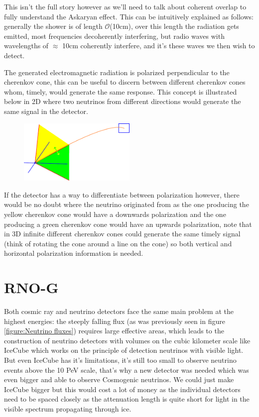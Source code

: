 \documentclass[11pt,a4paper,faculty=we,language=en,doctype=report]{cls/ugent-doc}
\begin{document}
This isn't the full story however as we'll need to talk about coherent overlap
to fully understand the Askaryan effect. This can be intuitively explained as
follows: generally the shower is of length
$\mathcal{O}$(10cm)\cite{Huege_2017}, over this length the radiation gets
emitted, most frequencies decoherently interfering, but radio waves with wavelengths of 
$\approx$ 10cm coherently interfere, and it's these waves we then wish to detect.


The generated electromagnetic radiation is polarized perpendicular to the
cherenkov cone, this can be useful to discern between different cherenkov cones whom,
timely, would generate the same response. This concept is illustrated below in 2D where
two neutrinos from different directions would generate the same signal in the detector.

\begin{figure}[h!]
	\centering
	\includegraphics[width=0.5\textwidth]{illu_polarization.pdf}
\end{figure}

If the detector has a way to differentiate between polarization however, there would be no
doubt where the neutrino originated from as the one producing the yellow cherenkov cone
would have a downwards polarization and the one producing a green cherenkov cone would have
an upwards polarization, note that in 3D infinite different cherenkov cones could generate
the same timely signal (think of rotating the cone around a line on the cone) so both vertical
and horizontal polarization information is needed.


\section{RNO-G}
Both cosmic ray and neutrino detectors face the same main problem at the
highest energies: the steeply falling flux (as was previously seen in figure
\ref{figure:Neutrino fluxes}) requires large effective areas, which leads to
the construction of neutrino detectors with volumes on the cubic kilometer
scale like IceCube\cite{IceCubeTechnical} which works on the principle of
detection neutrinos with visible light.  But even IceCube has it's limitations,
it's still too small to observe neutrino events above the 10 PeV
scale\cite{IceCubeGen2}, that's why a new detector was needed which was even
bigger and able to observe Cosmogenic neutrinos.  We could just make IceCube
bigger but this would cost a lot of money as the individual detectors need to
be spaced closely as the attenuation length is quite short for light in the
visible spectrum propagating through ice.  
\end{document}
